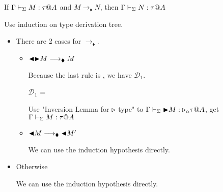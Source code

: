 \begin{theorem}
	If $\G\V M:\tau@A$ and $M\longrightarrow_\blacklozenge N$, then $\G\V N:\tau@A$\\
\end{theorem}
	
Use induction on type derivation tree.
	
\begin{itemize}
	\newcommand{\R}{\longrightarrow_{\blacklozenge}}
													
	\item \TTBL
	      	      	      	      	      	      	      	      		      	      	      	      
	      There are 2 cases for $\R$.
	      	      	      	      	      	      	      	      		      	      	      	      
	      \begin{itemize}
	      	\item $\TBL\TB M \R M$
	      	      	      	      	      	      	      	      	      	      	      	      	      	      	      	      		      	      	      	      	      	      	      	      
	      	      Because the last rule is \TTBL, we have $\mathcal{D}_1$.
	      	      	      	      	      	      	      	      	      	      	      	      	      	      	      	      		      	      	      	      	      	      	      	      
	      	      $\mathcal{D}_1$ = 
	      	      {}
	      	      	      	      	      	      	      	      	      	      	      	      	      	      	      	      		      	      	      	      	      	      	      	      
	      	      Use "Inversion Lemma for ${\mathop{\triangleright}}$ type" to $\Gamma \vdash_\Sigma {\mathop{\blacktriangleright}} M : {\mathop{\triangleright}}_\alpha \tau @A$,  get $\Gamma \vdash_\Sigma M : \tau @A$
	      	      	      	      	      	      	      	      	      	      	      	      	      	      	      	      		      	      	      	      	      	      	      	      
	      	\item $\TBL M \R \TBL M'$
	      	      	      	      	      	      	      	      	      	      	      	      	      	      	      	      		      	      	      	      	      	      	      	      
	      	      We can use the induction hypothesis directly.
	      \end{itemize}
	      	      	      	      	      	      	      	      		      	      	      	      
	\item Otherwise
	      	      	      	      	      	      	      	      		      	      	      	      
	      We can use the induction hypothesis directly.
\end{itemize}
	

